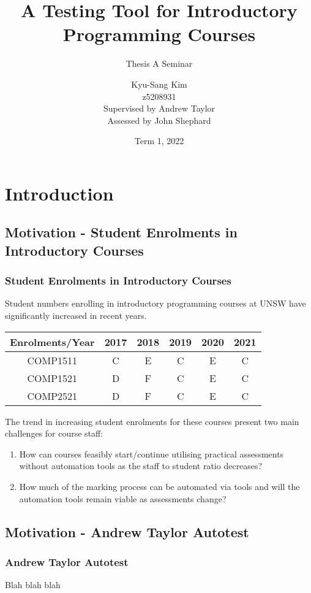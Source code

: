 \documentclass[xcolor]{beamer}
\author[Kyu-Sang Kim]{Kyu-Sang Kim\\z5208931\\\vspace{0.2cm}Supervised by Andrew Taylor\\Assessed by John Shephard}
\title[Thesis A Seminar]{A Testing Tool for Introductory Programming Courses}
\subtitle{Thesis A Seminar}
\date{Term 1, 2022}
\begin{document}
\begin{frame}
	\titlepage
\end{frame}


\section{Introduction}
\subsection{Motivation - Student Enrolments in Introductory Courses}
\begin{frame}
	\frametitle{Student Enrolments in Introductory Courses}
	Student numbers enrolling in introductory programming courses at UNSW have significantly increased in recent years.\\
	\begin{center}
		\begin{tabular}{|c|c|c|c|c|c|}
			\hline
			Enrolments/Year & 2017 & 2018 & 2019 & 2020 & 2021 \\ 
			\hline
			COMP1511 & C & E & C & E & C\\ 
			\hline
			COMP1521 & D & F & C & E & C\\
			\hline
			COMP2521 & D & F & C & E & C\\
			\hline
		\end{tabular}
	\end{center}
	The trend in increasing student enrolments for these courses present two main challenges for course staff:\\
	
	\begin{enumerate}
		\item How can courses feasibly start/continue utilising practical assessments without automation tools as the staff to student ratio decreases?
		\item How much of the marking process can be automated via tools and will the automation tools remain viable as assessments change?
	\end{enumerate}
	
\end{frame}

\subsection{Motivation - Andrew Taylor Autotest}
\begin{frame}
	\frametitle{Andrew Taylor Autotest}
	
	Blah blah blah
\end{frame}
\end{document}
